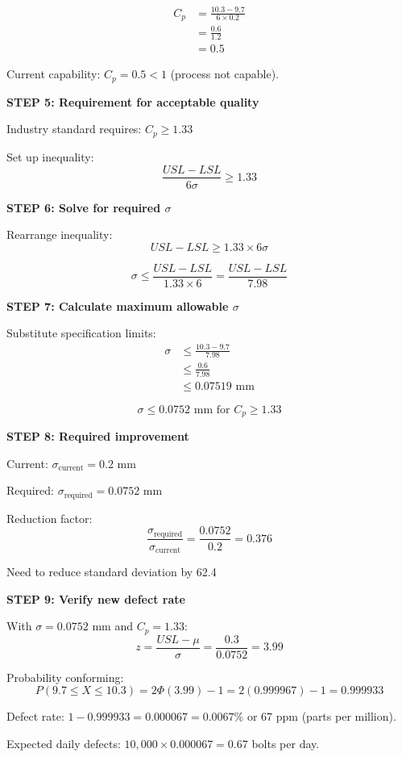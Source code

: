 \documentclass[12pt]{article}
\begin{document}
\begin{solution}
\begin{align*}
C_p &= \frac{10.3 - 9.7}{6 \times 0.2} \\
&= \frac{0.6}{1.2} \\
&= 0.5
\end{align*}

Current capability: $C_p = 0.5 < 1$ (process not capable).

\textbf{STEP 5: Requirement for acceptable quality}

Industry standard requires: $C_p \geq 1.33$

Set up inequality:
\[
\frac{USL - LSL}{6\sigma} \geq 1.33
\]

\textbf{STEP 6: Solve for required $\sigma$}

Rearrange inequality:
\[
USL - LSL \geq 1.33 \times 6\sigma
\]

\[
\sigma \leq \frac{USL - LSL}{1.33 \times 6} = \frac{USL - LSL}{7.98}
\]

\textbf{STEP 7: Calculate maximum allowable $\sigma$}

Substitute specification limits:
\begin{align*}
\sigma &\leq \frac{10.3 - 9.7}{7.98} \\
&\leq \frac{0.6}{7.98} \\
&\leq 0.07519 \text{ mm}
\end{align*}

\[
\boxed{\sigma \leq 0.0752 \text{ mm for } C_p \geq 1.33}
\]

\textbf{STEP 8: Required improvement}

Current: $\sigma_{\text{current}} = 0.2$ mm

Required: $\sigma_{\text{required}} = 0.0752$ mm

Reduction factor:
\[
\frac{\sigma_{\text{required}}}{\sigma_{\text{current}}} = \frac{0.0752}{0.2} = 0.376
\]

Need to reduce standard deviation by 62.4%

\textbf{STEP 9: Verify new defect rate}

With $\sigma = 0.0752$ mm and $C_p = 1.33$:
\[
z = \frac{USL - \mu}{\sigma} = \frac{0.3}{0.0752} = 3.99
\]

Probability conforming:
\[
P(9.7 \leq X \leq 10.3) = 2\Phi(3.99) - 1 = 2(0.999967) - 1 = 0.999933
\]

Defect rate: $1 - 0.999933 = 0.000067 = 0.0067\%$ or 67 ppm (parts per million).

Expected daily defects: $10,000 \times 0.000067 = 0.67$ bolts per day.


\end{solution}
\end{document}
